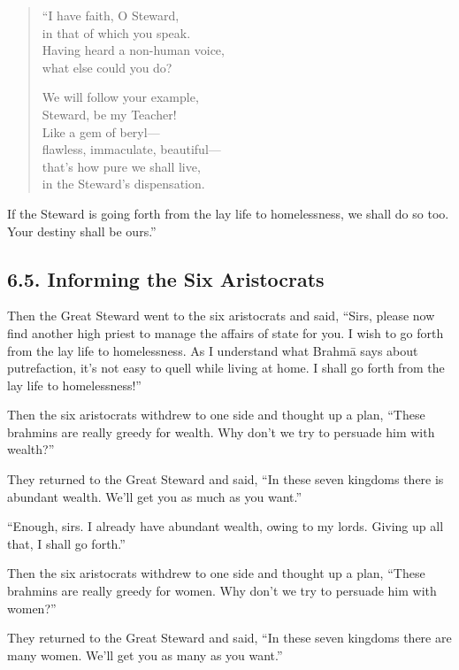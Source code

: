 \documentclass[12pt,openany]{book}%
\begin{document}
\begin{verse}
“I have faith, O Steward, \\
in that of which you speak. \\
Having heard a non-human voice, \\
what else could you do? 

We will follow your example, \\
Steward, be my Teacher! \\
Like a gem of beryl—\\
flawless, immaculate, beautiful—\\
that’s how pure we shall live, \\
in the Steward’s dispensation. 

%
\end{verse}

If the Steward is going forth from the lay life to homelessness, we shall do so too. Your destiny shall be ours.” 

\subsection*{6.5. Informing the Six Aristocrats }

Then the Great Steward went to the six aristocrats and said, “Sirs, please now find another high priest to manage the affairs of state for you. I wish to go forth from the lay life to homelessness. As I understand what \textsanskrit{Brahmā} says about putrefaction, it’s not easy to quell while living at home. I shall go forth from the lay life to homelessness!” 

Then the six aristocrats withdrew to one side and thought up a plan, “These brahmins are really greedy for wealth. Why don’t we try to persuade him with wealth?” 

They returned to the Great Steward and said, “In these seven kingdoms there is abundant wealth. We’ll get you as much as you want.” 

“Enough, sirs. I already have abundant wealth, owing to my lords. Giving up all that, I shall go forth.” 

Then the six aristocrats withdrew to one side and thought up a plan, “These brahmins are really greedy for women. Why don’t we try to persuade him with women?” 

They returned to the Great Steward and said, “In these seven kingdoms there are many women. We’ll get you as many as you want.” 
\end{document}
